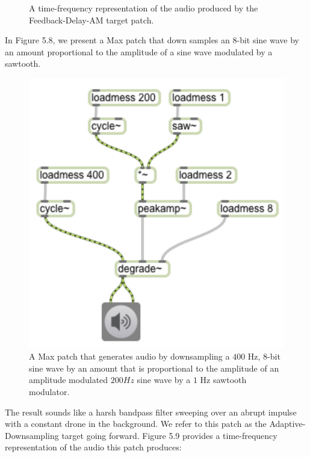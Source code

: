 \documentclass[a4paper,12pt]{report} 	%
\numberwithin{figure}{chapter}
\numberwithin{table}{chapter}
\numberwithin{equation}{chapter}
\begin{document}
\begin{flushleft}
\begin{figure}[h!]
\begin{center}
\caption[Delay Feedback AM Time-Frequency Representation]{A time-frequency representation of the audio produced by the Feedback-Delay-AM target patch.}
\end{center}
\end{figure}
In Figure 5.8, we present a Max patch that down samples an 8-bit sine wave by an amount proportional to the amplitude of a sine wave modulated by a sawtooth. 
\begin{figure}[h!]
\begin{center}
\includegraphics[scale=0.8]{AdaptiveDegrade}
\caption[Adaptive Downsampling Max Patch]{A Max patch that generates audio by downsampling a $400$ Hz, $8$-bit sine wave by an amount that is proportional to the amplitude of an amplitude modulated $200 Hz$ sine wave by a $1$ Hz sawtooth modulator.}
\end{center}
\end{figure}
The result sounds like a harsh bandpass filter sweeping over an abrupt impulse with a constant drone in the background. We refer to this patch as the Adaptive-Downsampling target going forward. Figure 5.9 provides a time-frequency representation of the audio this patch produces:
\begin{figure}[h!]
\begin{center}

\end{center}
\end{figure}
\end{flushleft}
\end{document}
